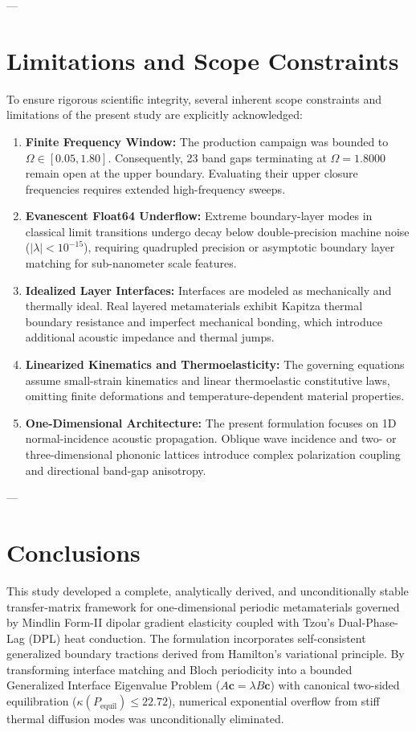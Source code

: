 \documentclass[11pt,a4paper]{article}
\begin{document}
---

\section{Limitations and Scope Constraints}
\label{sec:limitations}

To ensure rigorous scientific integrity, several inherent scope constraints and limitations of the present study are explicitly acknowledged:
\begin{enumerate}
    \item \textbf{Finite Frequency Window:} The production campaign was bounded to $\Omega \in [0.05, 1.80]$. Consequently, 23 band gaps terminating at $\Omega = 1.8000$ remain open at the upper boundary. Evaluating their upper closure frequencies requires extended high-frequency sweeps.
    \item \textbf{Evanescent Float64 Underflow:} Extreme boundary-layer modes in classical limit transitions undergo decay below double-precision machine noise ($|\lambda| < 10^{-15}$), requiring quadrupled precision or asymptotic boundary layer matching for sub-nanometer scale features.
    \item \textbf{Idealized Layer Interfaces:} Interfaces are modeled as mechanically and thermally ideal. Real layered metamaterials exhibit Kapitza thermal boundary resistance and imperfect mechanical bonding, which introduce additional acoustic impedance and thermal jumps.
    \item \textbf{Linearized Kinematics and Thermoelasticity:} The governing equations assume small-strain kinematics and linear thermoelastic constitutive laws, omitting finite deformations and temperature-dependent material properties.
    \item \textbf{One-Dimensional Architecture:} The present formulation focuses on 1D normal-incidence acoustic propagation. Oblique wave incidence and two- or three-dimensional phononic lattices introduce complex polarization coupling and directional band-gap anisotropy.
\end{enumerate}

---

\section{Conclusions}
\label{sec:conclusions}

This study developed a complete, analytically derived, and unconditionally stable transfer-matrix framework for one-dimensional periodic metamaterials governed by Mindlin Form-II dipolar gradient elasticity coupled with Tzou's Dual-Phase-Lag (DPL) heat conduction. The formulation incorporates self-consistent generalized boundary tractions derived from Hamilton's variational principle. By transforming interface matching and Bloch periodicity into a bounded Generalized Interface Eigenvalue Problem ($A\mathbf{c} = \lambda B\mathbf{c}$) with canonical two-sided equilibration ($\kappa(P_{\text{equil}}) \le 22.72$), numerical exponential overflow from stiff thermal diffusion modes was unconditionally eliminated.
\end{document}
